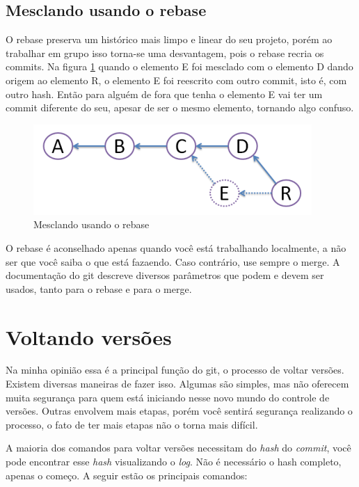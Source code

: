 \documentclass[12pt,openright,oneside,a4paper,english,brazil]{abntex2}
\begin{document}
\subsection{Mesclando usando o rebase}

O rebase preserva um histórico mais limpo e linear do seu projeto, porém ao trabalhar em grupo isso torna-se uma desvantagem, pois o rebase recria os commits. Na figura \ref{rebase} quando o elemento E foi mesclado com o elemento D dando origem ao elemento R, o elemento E foi reescrito com outro commit, isto é, com outro hash. Então para alguém de fora que tenha o elemento E vai ter um commit diferente do seu, apesar de ser o mesmo elemento, tornando algo confuso.

\begin{figure}[H]
	\caption{\label{rebase}Mesclando usando o rebase}
	\begin{center}
		\includegraphics[width=0.5\linewidth]{rebase}
	\end{center}
\end{figure}

O rebase é aconselhado apenas quando você está trabalhando localmente, a não ser que você saiba o que está fazaendo. Caso contrário, use sempre o merge. A documentação do git descreve diversos parâmetros que podem e devem ser usados, tanto para o rebase e para o merge.

\section{Voltando versões}

Na minha opinião essa é a principal função do git, o processo de voltar versões. Existem diversas maneiras de fazer isso. Algumas são simples, mas não oferecem muita segurança para quem está iniciando nesse novo mundo do controle de versões. Outras envolvem mais etapas, porém você sentirá segurança realizando o processo,  o fato de ter mais etapas não o torna mais difícil.

A maioria dos comandos para voltar versões necessitam do \textit{hash} do \textit{commit}, você pode encontrar esse \textit{hash} visualizando o \textit{log}. Não é necessário o hash completo, apenas o começo. A seguir estão os principais comandos:
\end{document}
